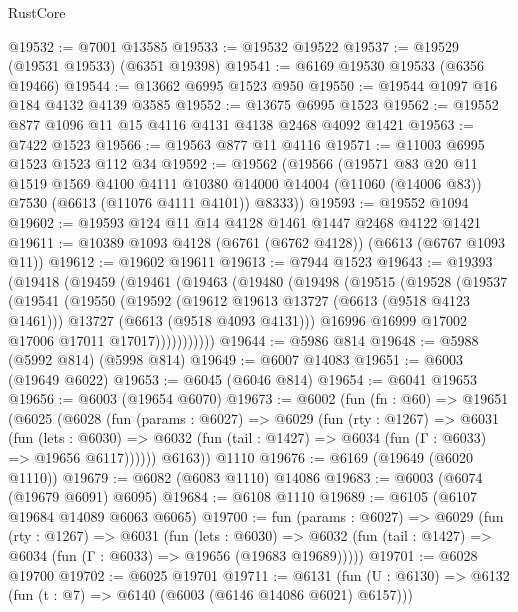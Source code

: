 \begin{lexlean}{RustCore}
\begin{coremodule}
@19532 := @7001 @13585
@19533 := @19532 @19522
@19537 := @19529 (@19531 @19533) (@6351 @19398)
@19541 := @6169 @19530 @19533 (@6356 @19466)
@19544 := @13662 @6995 @1523 @950
@19550 := @19544 @1097 @16 @184 @4132 @4139 @3585
@19552 := @13675 @6995 @1523
@19562 := @19552 @877 @1096 @11 @15 @4116 @4131 @4138 @2468 @4092 @1421
@19563 := @7422 @1523
@19566 := @19563 @877 @11 @4116
@19571 := @11003 @6995 @1523 @1523 @112 @34
@19592 := @19562
    (@19566
      (@19571
        @83
        @20
        @11
        @1519
        @1569
        @4100
        @4111
        @10380
        @14000
        @14004
        (@11060 (@14006 @83))
        @7530
        (@6613 (@11076 @4111 @4101))
        @8333))
@19593 := @19552 @1094
@19602 := @19593 @124 @11 @14 @4128 @1461 @1447 @2468 @4122 @1421
@19611 := @10389 @1093 @4128 (@6761 (@6762 @4128)) (@6613 (@6767 @1093 @11))
@19612 := @19602 @19611
@19613 := @7944 @1523
@19643 := @19393
    (@19418
      (@19459
        (@19461
          (@19463
            (@19480
              (@19498
                (@19515
                  (@19528
                    (@19537
                      (@19541
                        (@19550
                          (@19592
                            (@19612 @19613 @13727 (@6613 (@9518 @4123 @1461)))
                            @13727
                            (@6613 (@9518 @4093 @4131)))
                          @16996
                          @16999
                          @17002
                          @17006
                          @17011
                          @17017)))))))))))
@19644 := @5986 @814
@19648 := @5988 (@5992 @814) (@5998 @814)
@19649 := @6007 @14083
@19651 := @6003 (@19649 @6022)
@19653 := @6045 (@6046 @814)
@19654 := @6041 @19653
@19656 := @6003 (@19654 @6070)
@19673 := @6002
    (fun (fn : @60) =>
    @19651
      (@6025
        (@6028
          (fun (params : @6027) =>
          @6029
            (fun (rty : @1267) =>
            @6031
              (fun (lets : @6030) =>
              @6032 (fun (tail : @1427) => @6034 (fun (Γ : @6033) => @19656 @6117))))))
        @6163))
    @1110
@19676 := @6169 (@19649 (@6020 @1110))
@19679 := @6082 (@6083 @1110) @14086
@19683 := @6003 (@6074 (@19679 @6091) @6095)
@19684 := @6108 @1110
@19689 := @6105 (@6107 @19684 @14089 @6063 @6065)
@19700 := fun (params : @6027) =>
  @6029
    (fun (rty : @1267) =>
    @6031
      (fun (lets : @6030) =>
      @6032 (fun (tail : @1427) => @6034 (fun (Γ : @6033) => @19656 (@19683 @19689)))))
@19701 := @6028 @19700
@19702 := @6025 @19701
@19711 := @6131
    (fun (U : @6130) => @6132 (fun (t : @7) => @6140 (@6003 (@6146 @14086 @6021) @6157)))

\end{coremodule}
\end{lexlean}
